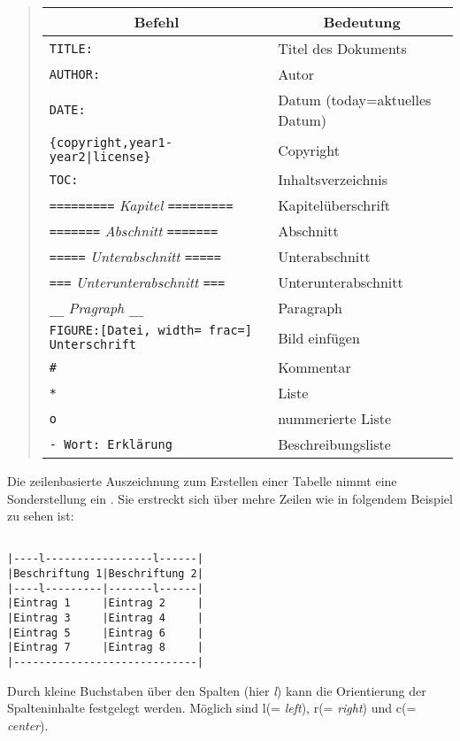 \documentclass[%
oneside,                 %
final,                   %
chapterprefix=true,      %
open=right,              %
10pt]{book}
\begin{document}
\begin{quote}
\begin{tabular}{ll}
\hline
\multicolumn{1}{c}{ Befehl } & \multicolumn{1}{c}{ Bedeutung } \\
\hline
\texttt{TITLE:}                                    & Titel des Dokuments           \\
\texttt{AUTHOR:}                                   & Autor                         \\
\texttt{DATE:}                                     & Datum (today=aktuelles Datum) \\
\Verb!{copyright,year1-year2|license}!           & Copyright                     \\
\texttt{TOC:}                                      & Inhaltsverzeichnis            \\
\texttt{=========} \emph{Kapitel} \texttt{=========} & Kapitelüberschrift           \\
\texttt{=======} \emph{Abschnitt} \texttt{=======}   & Abschnitt                     \\
\texttt{=====} \emph{Unterabschnitt} \texttt{=====}  & Unterabschnitt                \\
\texttt{===} \emph{Unterunterabschnitt} \texttt{===} & Unterunterabschnitt           \\
\Verb!__! \emph{Pragraph} \Verb!__!              & Paragraph                     \\
\texttt{FIGURE:[Datei, width= frac=] Unterschrift} & Bild einfügen                \\
\Verb!#!                                         & Kommentar                     \\
\texttt{*}                                         & Liste                         \\
\texttt{o}                                         & nummerierte Liste             \\
\texttt{- Wort: Erklärung}                        & Beschreibungsliste            \\
\hline
\end{tabular}
\end{quote}

\noindent
Die zeilenbasierte Auszeichnung zum Erstellen einer Tabelle nimmt eine Sonderstellung ein . Sie erstreckt sich über mehre Zeilen wie in folgendem Beispiel zu sehen ist:
\begin{verbatim}

|----l-----------------l------|
|Beschriftung 1|Beschriftung 2|
|----l---------|-------l------|
|Eintrag 1     |Eintrag 2     |
|Eintrag 3     |Eintrag 4     |
|Eintrag 5     |Eintrag 6     |
|Eintrag 7     |Eintrag 8     |
|-----------------------------|

\end{verbatim}
Durch kleine Buchstaben über den Spalten (hier \emph{l}) kann die Orientierung der Spalteninhalte festgelegt werden. Möglich sind l(= \emph{left}), r(= \emph{right}) und c(= \emph{center}).\\
\end{document}
